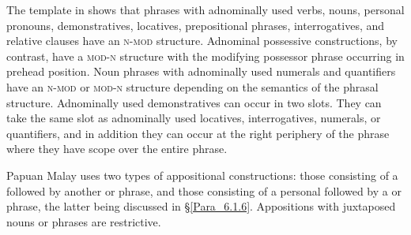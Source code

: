 The template in  shows that  phrases with adnominally used verbs, nouns, personal pronouns, demonstratives, locatives, 
prepositional phrases, 
interrogatives, 
and relative clauses have an \textsc{n-mod} structure. Adnominal possessive constructions, by contrast, have a \textsc{mod-n} structure with the modifying possessor phrase occurring in prehead position. Noun phrases with adnominally used numerals and quantifiers have an \textsc{n-mod} or \textsc{mod-n} structure depending on the semantics of the phrasal structure. Adnominally used demonstratives can occur in two slots. They can take the same slot as adnominally used locatives, interrogatives, numerals, or quantifiers, and in addition they can occur at the right periphery of the  phrase where they have scope over the entire  phrase.



Papuan Malay uses two types of appositional constructions: those consisting of a  followed by another  or  phrase, and those consisting of a personal  followed by a  or  phrase, the latter being discussed in §\ref{Para_6.1.6}. Appositions with juxtaposed nouns or  phrases are restrictive.

